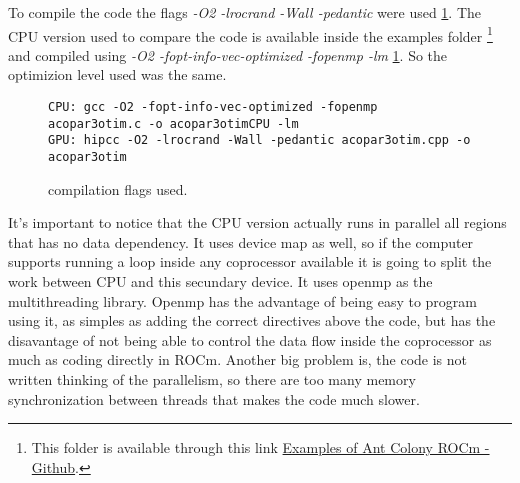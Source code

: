 To compile the code the flags \emph{-O2 -lrocrand -Wall -pedantic} were used \ref{fig:code5}.
The CPU version used to compare the code is available inside the examples folder \footnote{This folder is available through this link \href{https://github.com/LucasSnatiago/Ant-Colony-ROCm/tree/main/examples}{Examples of Ant Colony ROCm - Github}.} and compiled
using \emph{-O2 -fopt-info-vec-optimized -fopenmp -lm} \ref{fig:code5}. So the optimizion level used
was the same.

\begin{figure}[h!]
\begin{lstlisting}
CPU: gcc -O2 -fopt-info-vec-optimized -fopenmp acopar3otim.c -o acopar3otimCPU -lm
GPU: hipcc -O2 -lrocrand -Wall -pedantic acopar3otim.cpp -o acopar3otim
\end{lstlisting}
\caption{compilation flags used.}
\label{fig:code5}
\end{figure}

It's important to notice that the CPU version actually runs in parallel all
regions that has no data dependency. It uses device map as well, so if the computer
supports running a loop inside any coprocessor available it is going to split the work between CPU and this
secundary device.
It uses openmp as the multithreading library. Openmp has the advantage of being easy
to program using it, as simples as adding the correct directives above the code, but
has the disavantage of not being able to control the data flow inside the coprocessor as much
as coding directly in ROCm. Another big problem is, the code is not written thinking
of the parallelism, so there are too many memory synchronization between threads
that makes the code much slower.

